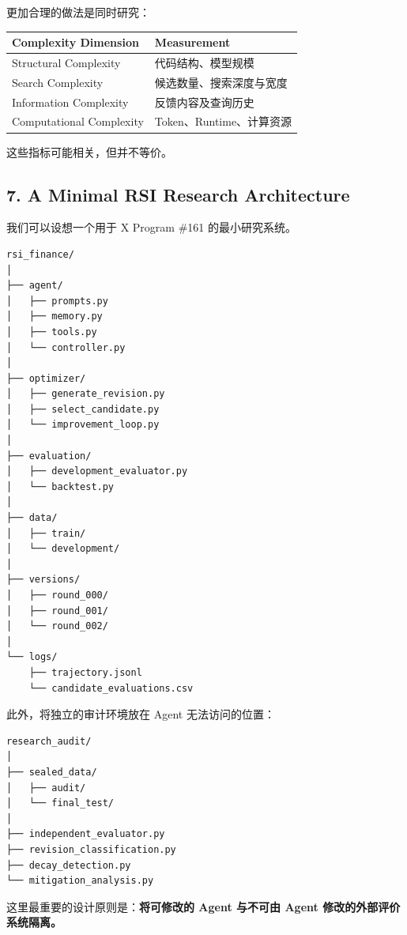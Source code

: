 更加合理的做法是同时研究：

\begin{readertable}
\begin{longtable}[]{@{}
  >{\raggedright\arraybackslash}p{}
  >{\raggedright\arraybackslash}p{}@{}}
\toprule
Complexity Dimension & Measurement \\
\midrule
\endhead
Structural Complexity & 代码结构、模型规模 \\
Search Complexity & 候选数量、搜索深度与宽度 \\
Information Complexity & 反馈内容及查询历史 \\
Computational Complexity & Token、Runtime、计算资源 \\
\bottomrule
\end{longtable}
\end{readertable}

这些指标可能相关，但并不等价。

\hypertarget{part-3-31-0001-a-minimal-rsi-research-architecture}{%
\subsection{7. A Minimal RSI Research Architecture}\label{part-3-31-0001-a-minimal-rsi-research-architecture}}

我们可以设想一个用于 X Program \#161 的最小研究系统。

\begin{verbatim}
rsi_finance/
│
├── agent/
│   ├── prompts.py
│   ├── memory.py
│   ├── tools.py
│   └── controller.py
│
├── optimizer/
│   ├── generate_revision.py
│   ├── select_candidate.py
│   └── improvement_loop.py
│
├── evaluation/
│   ├── development_evaluator.py
│   └── backtest.py
│
├── data/
│   ├── train/
│   └── development/
│
├── versions/
│   ├── round_000/
│   ├── round_001/
│   └── round_002/
│
└── logs/
    ├── trajectory.jsonl
    └── candidate_evaluations.csv
\end{verbatim}

此外，将独立的审计环境放在 Agent 无法访问的位置：

\begin{verbatim}
research_audit/
│
├── sealed_data/
│   ├── audit/
│   └── final_test/
│
├── independent_evaluator.py
├── revision_classification.py
├── decay_detection.py
└── mitigation_analysis.py
\end{verbatim}

这里最重要的设计原则是：\textbf{将可修改的 Agent 与不可由 Agent 修改的外部评价系统隔离。}

